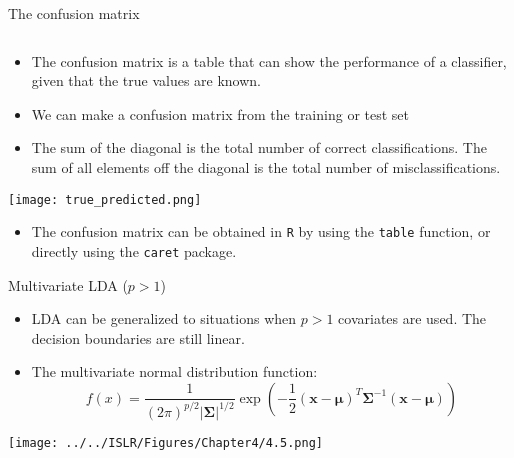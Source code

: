 \documentclass[10pt,ignorenonframetext,]{beamer}
\providecommand{\tightlist}{%
  \setlength{\itemsep}{0pt}\setlength{\parskip}{0pt}}
\begin{document}
\begin{frame}[fragile]

\begin{block}{The confusion matrix}

\(~\)

\begin{itemize}
\tightlist
\item
  The confusion matrix is a table that can show the performance of a
  classifier, given that the true values are known.
\end{itemize}

\vspace{2mm}

\begin{itemize}
\tightlist
\item
  We can make a confusion matrix from the training or test set
\end{itemize}

\vspace{2mm}

\begin{itemize}
\tightlist
\item
  The sum of the diagonal is the total number of correct
  classifications. The sum of all elements off the diagonal is the total
  number of misclassifications.
\end{itemize}

\centering

\texttt{[image: true\_predicted.png]}

\vspace{2mm}
\flushleft

\begin{itemize}
\tightlist
\item
  The confusion matrix can be obtained in \texttt{R} by using the
  \texttt{table} function, or directly using the \texttt{caret} package.
\end{itemize}

\end{block}

\end{frame}

\begin{frame}{Multivariate LDA (\(p>1\))}
\protect\hypertarget{multivariate-lda-p1}{}

\vspace{2mm}

\begin{itemize}
\item
  LDA can be generalized to situations when \(p>1\) covariates are used.
  The decision boundaries are still linear.
\item
  The multivariate normal distribution function:
  \[f(x) = \frac{1}{(2 \pi)^{p/2}|\boldsymbol{\Sigma}|^{1/2}}\exp({-\frac{1}{2}({\boldsymbol x}-\boldsymbol\mu)^T \boldsymbol{\Sigma}^{-1}({\boldsymbol x}-\boldsymbol\mu)})\]
\end{itemize}

\centering

\texttt{[image: ../../ISLR/Figures/Chapter4/4.5.png]}

\end{frame}
\end{document}
